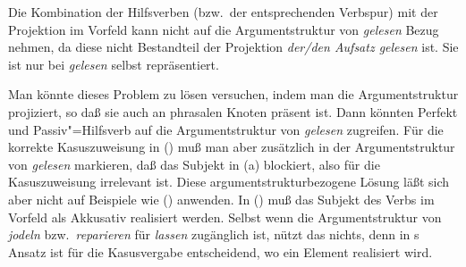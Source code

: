Die Kombination der Hilfsverben (bzw.\ der entsprechenden Verbspur)
mit der Projektion im Vorfeld kann nicht auf die Argumentstruktur von
\emph{gelesen} Bezug nehmen, da diese nicht Bestandteil der Projektion
\emph{der/den Aufsatz gelesen} ist. Sie ist nur bei \emph{gelesen} selbst repräsentiert.

Man könnte dieses Problem zu lösen versuchen, indem man die Argumentstruktur
projiziert, so daß sie auch an phrasalen Knoten präsent ist. Dann könnten Perfekt
und Passiv"=Hilfsverb auf die Argumentstruktur von \emph{gelesen} zugreifen.
Für die korrekte Kasuszuweisung in () muß man aber zusätzlich
in der Argumentstruktur von \emph{gelesen} markieren, daß das Subjekt
in (a) blockiert, also für die Kasuszuweisung irrelevant ist.
Diese argumentstrukturbezogene Lösung läßt sich aber nicht auf Beispiele
wie () anwenden. In () muß das Subjekt des Verbs im Vorfeld
als Akkusativ realisiert werden.
\eal
\label{bsp-den-saenger-jodeln}
\zl
Selbst wenn die Argumentstruktur von \emph{jodeln} bzw.\ \emph{reparieren}
für \emph{lassen} zugänglich ist, nützt das nichts, denn in \prz{}s
Ansatz ist für die Kasusvergabe entscheidend, wo ein Element realisiert wird.

